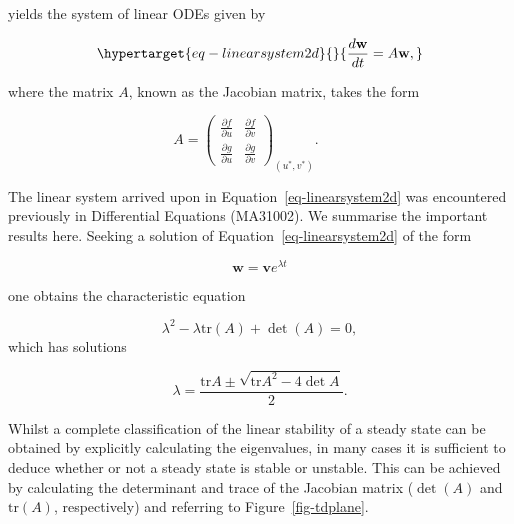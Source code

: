 \documentclass[
  letterpaper,
  DIV=11,
  numbers=noendperiod]{scrreprt}
\begin{document}
yields the system of linear ODEs given by

\begin{equation}\protect\hypertarget{eq-linearsystem2d}{}{
\frac{d \mathbf{w}}{dt}= A \mathbf{w},
}\label{eq-linearsystem2d}\end{equation}

where the matrix \(A\), known as the Jacobian matrix, takes the form

\[
A=\left(\begin{array}{rr}
\frac{\partial f}{\partial u}&\frac{\partial f}{\partial v} \\ \frac{\partial g}{\partial u}&\frac{\partial g}{\partial v} \end{array}\right)_{(u^*,v^*)}. \qquad
\]

The linear system arrived upon in Equation~\ref{eq-linearsystem2d} was
encountered previously in Differential Equations (MA31002). We summarise
the important results here. Seeking a solution of
Equation~\ref{eq-linearsystem2d} of the form

\[
\mathbf{w}=\mathbf{v}e^{\lambda t}
\]

one obtains the characteristic equation

\[
\lambda^2 -\lambda \mathrm{tr}(A)+\det(A)=0,
\] which has solutions

\[
\lambda = \frac{\mathrm{tr}{A}\pm \sqrt{\mathrm{tr}{A}^2-4\det{A}}}{2}.
\]

Whilst a complete classification of the linear stability of a steady
state can be obtained by explicitly calculating the eigenvalues, in many
cases it is sufficient to deduce whether or not a steady state is stable
or unstable. This can be achieved by calculating the determinant and
trace of the Jacobian matrix (\(\det(A)\) and \(\mathrm{tr}(A)\),
respectively) and referring to Figure~\ref{fig-tdplane}.
\end{document}
